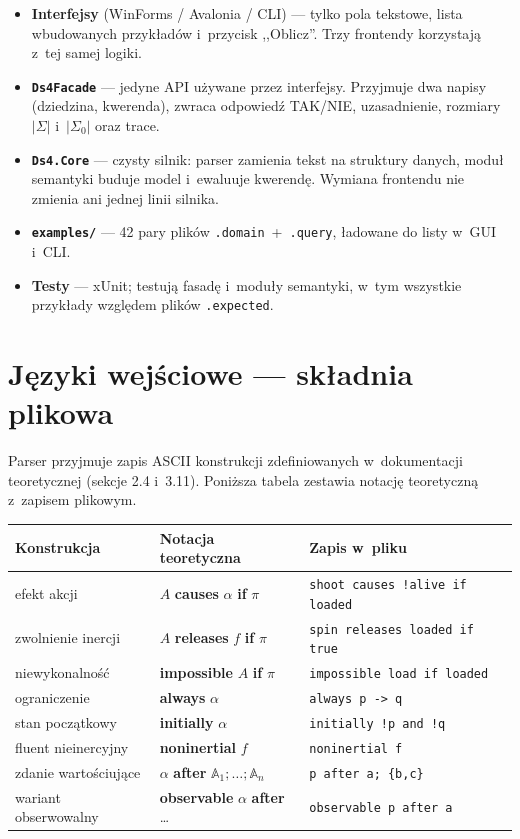 \documentclass[11pt,a4paper]{article}
\begin{document}
\begin{itemize}
  \item \textbf{Interfejsy} (WinForms / Avalonia / CLI) --- tylko pola tekstowe,
        lista wbudowanych przykładów i~przycisk ,,Oblicz''. Trzy frontendy
        korzystają z~tej samej logiki.
  \item \texttt{\textbf{Ds4Facade}} --- jedyne API używane przez interfejsy.
        Przyjmuje dwa napisy (dziedzina, kwerenda), zwraca odpowiedź TAK/NIE,
        uzasadnienie, rozmiary $|\Sigma|$ i~$|\Sigma_0|$ oraz trace.
  \item \texttt{\textbf{Ds4.Core}} --- czysty silnik: parser zamienia tekst na
        struktury danych, moduł semantyki buduje model i~ewaluuje kwerendę.
        Wymiana frontendu nie zmienia ani jednej linii silnika.
  \item \texttt{\textbf{examples/}} --- 42 pary plików
        \texttt{.domain}~+~\texttt{.query}, ładowane do listy w~GUI i~CLI.
  \item \textbf{Testy} --- xUnit; testują fasadę i~moduły semantyki, w~tym
        wszystkie przykłady względem plików \texttt{.expected}.
\end{itemize}

\section{Języki wejściowe --- składnia plikowa}

Parser przyjmuje zapis ASCII konstrukcji zdefiniowanych w~dokumentacji
teoretycznej (sekcje 2.4 i~3.11). Poniższa tabela zestawia notację
teoretyczną z~zapisem plikowym.

\begin{center}
\small
\begin{tabular}{@{}lll@{}}
\toprule
\textbf{Konstrukcja} & \textbf{Notacja teoretyczna} & \textbf{Zapis w~pliku} \\
\midrule
efekt akcji        & $A$ \textbf{causes} $\alpha$ \textbf{if} $\pi$ & \texttt{shoot causes !alive if loaded} \\
zwolnienie inercji & $A$ \textbf{releases} $f$ \textbf{if} $\pi$    & \texttt{spin releases loaded if true} \\
niewykonalność     & \textbf{impossible} $A$ \textbf{if} $\pi$      & \texttt{impossible load if loaded} \\
ograniczenie       & \textbf{always} $\alpha$                       & \texttt{always p -> q} \\
stan początkowy    & \textbf{initially} $\alpha$                    & \texttt{initially !p and !q} \\
fluent nieinercyjny& \textbf{noninertial} $f$                       & \texttt{noninertial f} \\
zdanie wartościujące & $\alpha$ \textbf{after} $\mathbb{A}_1;\dots;\mathbb{A}_n$ & \texttt{p after a; \{b,c\}} \\
wariant obserwowalny & \textbf{observable} $\alpha$ \textbf{after} \dots & \texttt{observable p after a} \\
\bottomrule
\end{tabular}
\end{center}
\end{document}
